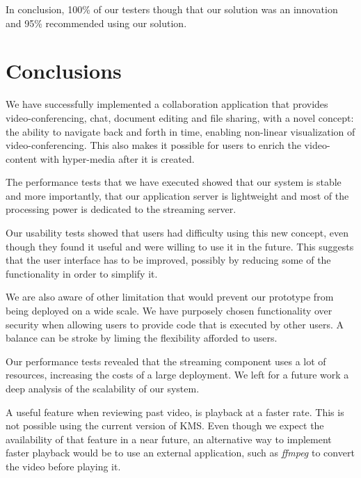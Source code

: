 \documentclass[10pt,conference]{IEEEtran}
\begin{document}
In conclusion, 100\% of our testers though that our solution was an innovation and 95\% recommended using our solution.
















\section{Conclusions}
\label{chapter:conclusion}

We have successfully implemented a collaboration application that provides video-conferencing, chat, document editing and file sharing, with a novel concept: the ability to navigate back and forth in time, enabling non-linear visualization of video-conferencing.
This also makes it possible for users to enrich the video-content with hyper-media after it is created.

The performance tests that we have executed showed that our system is stable and more importantly, that our application server is lightweight and most of the processing power is dedicated to the streaming server.

Our usability tests showed that users had difficulty using this new concept, even though they found it useful and were willing to use it in the future.
This suggests that the user interface has to be improved, possibly by reducing some of the functionality in order to simplify it.

We are also aware of other limitation that would prevent our prototype from being deployed on a wide scale.
We have purposely chosen functionality over security when allowing users to provide code that is executed by other users.
A balance can be stroke by liming the flexibility afforded to users.

Our performance tests revealed that the streaming component uses a lot of resources, increasing the costs of a large deployment.
We left for a future work a deep analysis of the scalability of our system.

A useful feature when reviewing past video, is playback at a faster rate.
This is not possible using the current version of \gls{KMS}.
Even though we expect the availability of that feature in a near future, an alternative way to implement faster playback would be to use an external application, such as \emph{ffmpeg} to convert the video before playing it.
\end{document}
